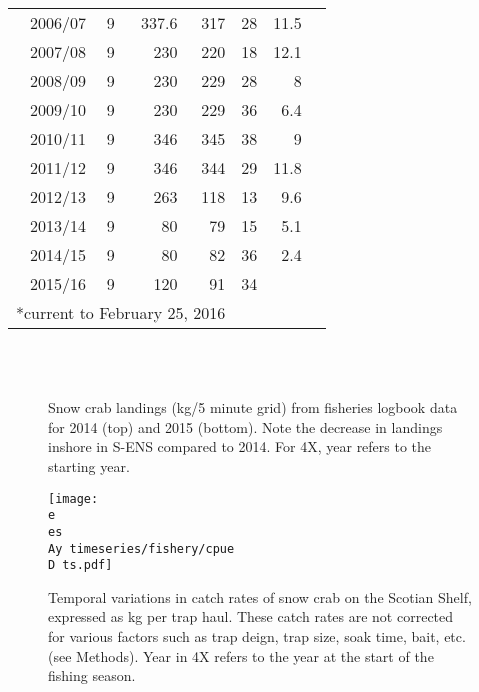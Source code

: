 \documentclass[paper=a4, fontsize=11pt]{article}
\newcommand{\D}{.}
\newcommand{\e}{\string~/ecomod_data/}   %
\newcommand{\es}{snowcrab/}
\newcommand{\Ay}{assessments/2015/}
\begin{document}
\begin{table}[h]
\begin{center}
\begin{tabular}{rrrrrrr}
2006/07 &   9 & 337.6 & 317 & 28 & 11.5 \\ 
2007/08 &   9 & 230 & 220 & 18 & 12.1 \\ 
2008/09 &   9 & 230 & 229 & 28 & 8 \\ 
2009/10 &   9 & 230 & 229 & 36 & 6.4 \\ 
2010/11 &   9 & 346 & 345 & 38 & 9 \\ 
2011/12 &   9 & 346 & 344 & 29 & 11.8 \\ 
2012/13 &   9 & 263 & 118 & 13 & 9.6 \\ 
2013/14 &   9 & 80 &  79 & 15 & 5.1 \\ 
2014/15 &   9 & 80 &  82 & 36 & 2.4 \\ 
2015/16 &   9& 120 &  91 & 34 &  \\ 
   \hline
   \multicolumn{4}{c}{*current to February 25, 2016}
  \end{tabular}
  \end{center}
\end{table}



\begin{figure}[h]
	\centering
	\\
	\\
	\caption{Snow crab landings (kg/5 minute grid) from fisheries logbook data for 2014 (top) and 2015 (bottom). Note the decrease in landings inshore in S-ENS compared to 2014. For 4X, year refers to the starting year.}
\end{figure}
\begin{figure}[h]
    \centering
    \texttt{[image: \\e \\es \\Ay timeseries/fishery/cpue\\D ts.pdf]}
    \caption{Temporal variations in catch rates of snow crab on the Scotian Shelf, expressed as kg per trap haul. These catch rates are not corrected for various factors such as trap deign, trap size, soak time, bait, etc. (see Methods). Year in 4X refers to the year at the start of the fishing season.}
\end{figure}
\end{document}
